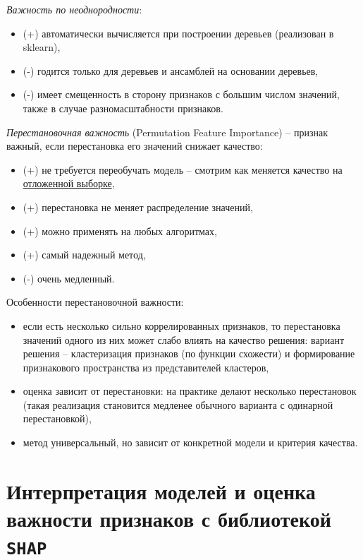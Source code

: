 \documentclass[%
	11pt,
	a4paper,
	utf8,
		]{article}
\begin{document}
\emph{Важность по неоднородности}:
\begin{itemize}
	\item (+) автоматически вычисляется при построении деревьев (реализован в sklearn),
	
	\item (-) годится только для деревьев и ансамблей на основании деревьев,
	
	\item (-) имеет смещенность в сторону признаков с большим числом значений, также в случае разномасштабности признаков.
\end{itemize}

\emph{Перестановочная важность} (Permutation Feature Importance) -- признак важный, если перестановка его значений снижает качество:
\begin{itemize}
	\item (+) не требуется переобучать модель -- смотрим как меняется качество на \underline{отложенной выборке},
	
	\item (+) перестановка не меняет распределение значений,
	
	\item (+) можно применять на любых алгоритмах,
	
	\item (+) самый надежный метод,
	
	\item (-) очень медленный.
\end{itemize}

Особенности перестановочной важности:
\begin{itemize}
	\item если есть несколько сильно коррелированных признаков, то перестановка значений одного из них может слабо влиять на качество решения: вариант решения -- кластеризация признаков (по функции схожести) и формирование признакового пространства из представителей кластеров,
	
	\item оценка зависит от перестановки: на практике делают несколько перестановок (такая реализация становится медленее обычного варианта с одинарной перестановкой),
	
	\item метод универсальный, но зависит от конкретной модели и критерия качества.
\end{itemize}


\section{Интерпретация моделей и оценка важности признаков с библиотекой \texttt{SHAP}}
\end{document}

